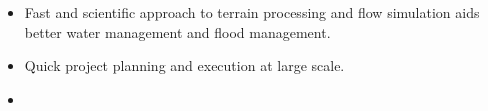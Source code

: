 \begin{itemize}
    \item Fast and scientific approach to terrain processing and flow simulation aids better water management and flood management.
    \item Quick project planning and execution at large scale.
    \item 
\end{itemize}
